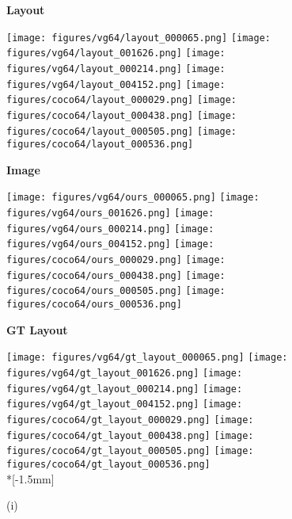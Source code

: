 \documentclass[10pt,twocolumn,letterpaper]{article}
\begin{document}
\begin{figure*}[ht!]
\begin{rotate}{90}
    \hspace{4mm}
    \textbf{Layout}
  \end{rotate}
  \hspace*{0.5mm}
  \texttt{[image: figures/vg64/layout\_000065.png]}
  \texttt{[image: figures/vg64/layout\_001626.png]}
  \texttt{[image: figures/vg64/layout\_000214.png]}
  \texttt{[image: figures/vg64/layout\_004152.png]}
  \texttt{[image: figures/coco64/layout\_000029.png]}
  \texttt{[image: figures/coco64/layout\_000438.png]}
  \texttt{[image: figures/coco64/layout\_000505.png]}
  \texttt{[image: figures/coco64/layout\_000536.png]} \\
  \begin{rotate}{90}
    \hspace{6mm}\textbf{Image}
  \end{rotate}
  \hspace*{0.5mm}
  \texttt{[image: figures/vg64/ours\_000065.png]}
  \texttt{[image: figures/vg64/ours\_001626.png]}
  \texttt{[image: figures/vg64/ours\_000214.png]}
  \texttt{[image: figures/vg64/ours\_004152.png]} 
  \texttt{[image: figures/coco64/ours\_000029.png]}
  \texttt{[image: figures/coco64/ours\_000438.png]}
  \texttt{[image: figures/coco64/ours\_000505.png]}
  \texttt{[image: figures/coco64/ours\_000536.png]} \\
  \begin{rotate}{90}
    \hspace{1mm}
    \textbf{GT Layout}
  \end{rotate}
  \hspace*{0.5mm}
  \texttt{[image: figures/vg64/gt\_layout\_000065.png]}
  \texttt{[image: figures/vg64/gt\_layout\_001626.png]}
  \texttt{[image: figures/vg64/gt\_layout\_000214.png]}
  \texttt{[image: figures/vg64/gt\_layout\_004152.png]} 
  \texttt{[image: figures/coco64/gt\_layout\_000029.png]}
  \texttt{[image: figures/coco64/gt\_layout\_000438.png]}
  \texttt{[image: figures/coco64/gt\_layout\_000505.png]}
  \texttt{[image: figures/coco64/gt\_layout\_000536.png]} \\*[-1.5mm]
  \begin{minipage}{\qualsize} \centering\scriptsize (i) \end{minipage}

\end{figure*}
\end{document}
